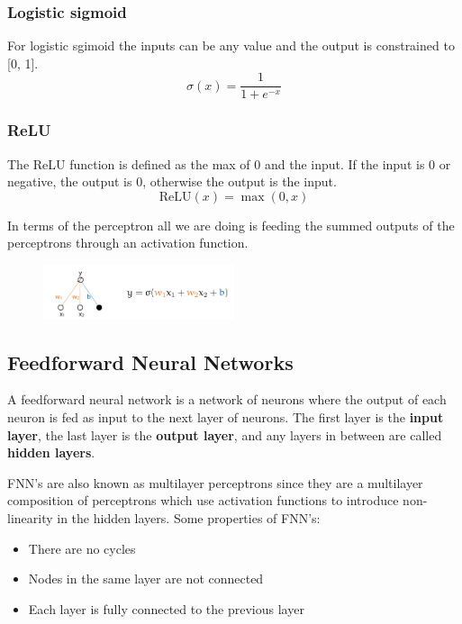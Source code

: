 \documentclass[12pt]{article}
\begin{document}
\begin{multicols}{2}
    \subsubsection*{Logistic sigmoid}
    For logistic sgimoid the inputs can be any value and the output is constrained to [0, 1].
    \[ \sigma(x) = \frac{1}{1 + e^{-x}} \]
    \columnbreak
    \subsubsection*{ReLU}
    The ReLU function is defined as the max of 0 and the input. If the input is 0 or negative, the output is 0, otherwise the output is the input.
    \[ \text{ReLU}(x) = \max(0, x) \]
    \vfill\null
\end{multicols}

\newpage
In terms of the perceptron all we are doing is feeding the summed outputs of the perceptrons through an activation function. 

\begin{figure}[!h]
    \centering
    \includegraphics[width=0.5\textwidth]{assets/perceptronwithact.png}
\end{figure}

\subsection{Feedforward Neural Networks}

\begin{definition}
    A feedforward neural network is a network of neurons where the output of each neuron is fed as input to the next layer of neurons. The first layer is the \textbf{input layer}, the last layer is the \textbf{output layer}, and any layers in between are called \textbf{hidden layers}.
\end{definition}

FNN's are also known as multilayer perceptrons since they are a multilayer composition of perceptrons which use activation functions to introduce non-linearity in the hidden layers. 
\smallskip
Some properties of FNN's:
\begin{itemize}[leftmargin=*, noitemsep]
    \item There are no cycles
    \item Nodes in the same layer are not connected
    \item Each layer is fully connected to the previous layer
\end{itemize}
\end{document}
